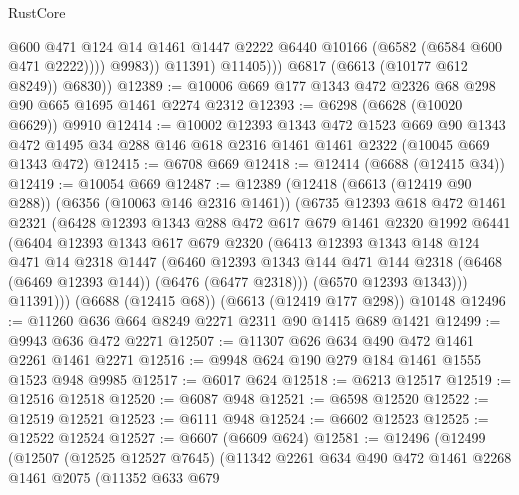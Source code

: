 \begin{lexlean}{RustCore}
\begin{coremodule}
                        @600
                        @471
                        @124
                        @14
                        @1461
                        @1447
                        @2222
                        @6440
                        @10166
                        (@6582 (@6584 @600 @471 @2222))))
                    @9983))
                @11391)
              @11405)))
        @6817
        (@6613 (@10177 @612 @8249))
        @6830))
@12389 := @10006 @669 @177 @1343 @472 @2326 @68 @298 @90 @665 @1695 @1461 @2274 @2312
@12393 := @6298 (@6628 (@10020 @6629)) @9910
@12414 := @10002
    @12393
    @1343
    @472
    @1523
    @669
    @90
    @1343
    @472
    @1495
    @34
    @288
    @146
    @618
    @2316
    @1461
    @1461
    @2322
    (@10045 @669 @1343 @472)
@12415 := @6708 @669
@12418 := @12414 (@6688 (@12415 @34))
@12419 := @10054 @669
@12487 := @12389
    (@12418
      (@6613 (@12419 @90 @288))
      (@6356 (@10063 @146 @2316 @1461))
      (@6735
        @12393
        @618
        @472
        @1461
        @2321
        (@6428
          @12393
          @1343
          @288
          @472
          @617
          @679
          @1461
          @2320
          @1992
          @6441
          (@6404
            @12393
            @1343
            @617
            @679
            @2320
            (@6413
              @12393
              @1343
              @148
              @124
              @471
              @14
              @2318
              @1447
              (@6460
                @12393
                @1343
                @144
                @471
                @144
                @2318
                (@6468 (@6469 @12393 @144))
                (@6476 (@6477 @2318)))
              (@6570 @12393 @1343)))
          @11391)))
    (@6688 (@12415 @68))
    (@6613 (@12419 @177 @298))
    @10148
@12496 := @11260 @636 @664 @8249 @2271 @2311 @90 @1415 @689 @1421
@12499 := @9943 @636 @472 @2271
@12507 := @11307 @626 @634 @490 @472 @1461 @2261 @1461 @2271
@12516 := @9948 @624 @190 @279 @184 @1461 @1555 @1523 @948 @9985
@12517 := @6017 @624
@12518 := @6213 @12517
@12519 := @12516 @12518
@12520 := @6087 @948
@12521 := @6598 @12520
@12522 := @12519 @12521
@12523 := @6111 @948
@12524 := @6602 @12523
@12525 := @12522 @12524
@12527 := @6607 (@6609 @624)
@12581 := @12496
    (@12499
      (@12507
        (@12525 @12527 @7645)
        (@11342
          @2261
          @634
          @490
          @472
          @1461
          @2268
          @1461
          @2075
          (@11352
            @633
            @679

\end{coremodule}
\end{lexlean}
